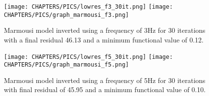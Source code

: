 \begin{landscape}
\begin{figure}[!ht]
  \centering
 \texttt{[image: CHAPTERS/PICS/lowres\_f3\_30it.png]}
  \vspace*{\floatsep}
  \texttt{[image: CHAPTERS/PICS/graph\_marmousi\_f3.png]}
\caption[Marmousi model inverted using a frequency of 3Hz for 30 iterations]{Marmousi model inverted using a frequency of 3Hz for 30 iterations with a final residual 46.13 and a minimum functional value of 0.12.}
 \label{mar_f3}
\end{figure}
\begin{figure}

\vspace*{\floatsep}
 \centering
 \texttt{[image: CHAPTERS/PICS/lowres\_f5\_30it.png]}
  \vspace*{\floatsep}
  \texttt{[image: CHAPTERS/PICS/graph\_marmousi\_f5.png]}
\caption[Marmousi velocity model inverted using a frequency of 5Hz for 30 iterations]{Marmousi model inverted using a frequency of 5Hz for 30 iterations with final residual of 45.95 and a minimum functional value of 0.10.}
 \label{mar_f5}
\end{figure}

\end{landscape}